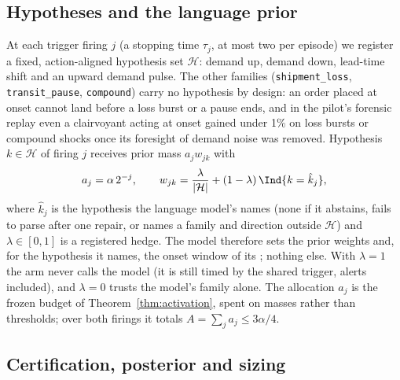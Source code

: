 \subsection{Hypotheses and the language prior}

At each trigger firing $j$ (a stopping time $\tau_j$, at most two per episode) we
register a fixed, action-aligned hypothesis set $\mathcal{H}$: demand up, demand
down, lead-time shift and an upward demand pulse. The other families (\texttt{shipment\_loss},
\texttt{transit\_pause}, \texttt{compound}) carry no hypothesis by design: an order
placed at onset cannot land before a loss burst or a pause ends, and in the pilot's
forensic replay even a clairvoyant acting at onset gained under 1\% on loss bursts or
compound shocks once its foresight of demand noise was removed. Hypothesis $k \in \mathcal{H}$ of firing
$j$ receives prior mass $a_j w_{jk}$ with
\begin{equation}
a_j = \alpha\,2^{-j}, \qquad
w_{jk} = \frac{\lambda}{|\mathcal{H}|} + (1-\lambda)\,\Ind\{k = \hat k_j\},
\label{eq:prior}
\end{equation}
where $\hat k_j$ is the hypothesis the language model's \shockspec{} names (none if
it abstains, fails to parse after one repair, or names a family and direction
outside $\mathcal{H}$) and $\lambda\in[0,1]$ is a registered hedge. The model
therefore sets the prior weights and, for the hypothesis it names, the onset window
of its \eprocess{}; nothing else. With $\lambda = 1$ the arm never calls the model
(it is still timed by the shared trigger, alerts included), and $\lambda = 0$
trusts the model's family alone. The allocation $a_j$ is the frozen budget of
Theorem~\ref{thm:activation}, spent on masses rather than thresholds; over both
firings it totals $A = \sum_j a_j \le 3\alpha/4$.

\subsection{Certification, posterior and sizing}

